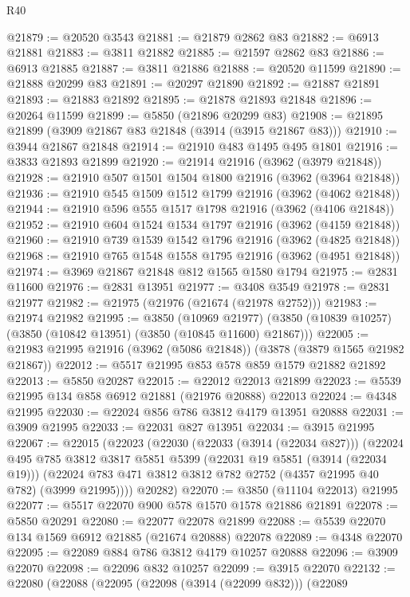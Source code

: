 \begin{lexlean}{R40}
\begin{coremodule}
@21879 := @20520 @3543
@21881 := @21879 @2862 @83
@21882 := @6913 @21881
@21883 := @3811 @21882
@21885 := @21597 @2862 @83
@21886 := @6913 @21885
@21887 := @3811 @21886
@21888 := @20520 @11599
@21890 := @21888 @20299 @83
@21891 := @20297 @21890
@21892 := @21887 @21891
@21893 := @21883 @21892
@21895 := @21878 @21893 @21848
@21896 := @20264 @11599
@21899 := @5850 (@21896 @20299 @83)
@21908 := @21895 @21899 (@3909 @21867 @83 @21848 (@3914 (@3915 @21867 @83)))
@21910 := @3944 @21867 @21848
@21914 := @21910 @483 @1495 @495 @1801
@21916 := @3833 @21893 @21899
@21920 := @21914 @21916 (@3962 (@3979 @21848))
@21928 := @21910 @507 @1501 @1504 @1800 @21916 (@3962 (@3964 @21848))
@21936 := @21910 @545 @1509 @1512 @1799 @21916 (@3962 (@4062 @21848))
@21944 := @21910 @596 @555 @1517 @1798 @21916 (@3962 (@4106 @21848))
@21952 := @21910 @604 @1524 @1534 @1797 @21916 (@3962 (@4159 @21848))
@21960 := @21910 @739 @1539 @1542 @1796 @21916 (@3962 (@4825 @21848))
@21968 := @21910 @765 @1548 @1558 @1795 @21916 (@3962 (@4951 @21848))
@21974 := @3969 @21867 @21848 @812 @1565 @1580 @1794
@21975 := @2831 @11600
@21976 := @2831 @13951
@21977 := @3408 @3549
@21978 := @2831 @21977
@21982 := @21975 (@21976 (@21674 (@21978 @2752)))
@21983 := @21974 @21982
@21995 := @3850
    (@10969 @21977)
    (@3850 (@10839 @10257) (@3850 (@10842 @13951) (@3850 (@10845 @11600) @21867)))
@22005 := @21983 @21995 @21916 (@3962 (@5086 @21848)) (@3878 (@3879 @1565 @21982 @21867))
@22012 := @5517 @21995 @853 @578 @859 @1579 @21882 @21892
@22013 := @5850 @20287
@22015 := @22012 @22013 @21899
@22023 := @5539 @21995 @134 @858 @6912 @21881 (@21976 @20888) @22013
@22024 := @4348 @21995
@22030 := @22024 @856 @786 @3812 @4179 @13951 @20888
@22031 := @3909 @21995
@22033 := @22031 @827 @13951
@22034 := @3915 @21995
@22067 := @22015
    (@22023
      (@22030
        (@22033 (@3914 (@22034 @827)))
        (@22024
          @495
          @785
          @3812
          @3817
          @5851
          @5399
          (@22031 @19 @5851 (@3914 (@22034 @19)))
          (@22024 @783 @471 @3812 @3812 @782 @2752 (@4357 @21995 @40 @782) (@3999 @21995))))
      @20282)
@22070 := @3850 (@11104 @22013) @21995
@22077 := @5517 @22070 @900 @578 @1570 @1578 @21886 @21891
@22078 := @5850 @20291
@22080 := @22077 @22078 @21899
@22088 := @5539 @22070 @134 @1569 @6912 @21885 (@21674 @20888) @22078
@22089 := @4348 @22070
@22095 := @22089 @884 @786 @3812 @4179 @10257 @20888
@22096 := @3909 @22070
@22098 := @22096 @832 @10257
@22099 := @3915 @22070
@22132 := @22080
    (@22088
      (@22095
        (@22098 (@3914 (@22099 @832)))
        (@22089

\end{coremodule}
\end{lexlean}
